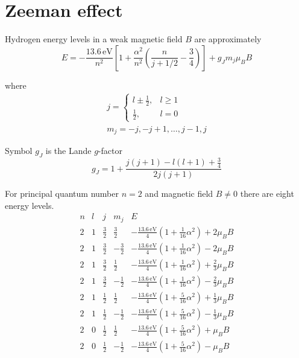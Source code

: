 

\section*{Zeeman effect}

Hydrogen energy levels in a weak magnetic field $B$ are approximately
\begin{equation*}
E=-\frac{13.6\,\text{eV}}{n^2}
\left[
1+\frac{\alpha^2}{n^2}\left(\frac{n}{j+1/2}-\frac{3}{4}\right)
\right]+g_Jm_j\mu_BB
\end{equation*}

where
\begin{gather*}
j=\begin{cases}
l\pm\frac{1}{2}, & l\ge1
\\
\frac{1}{2}, & l=0
\end{cases}
\\[1ex]
m_j=-j,-j+1,\ldots,j-1,j
\end{gather*}

Symbol $g_J$ is the Lande $g$-factor
\begin{equation*}
g_J=1+\frac{j(j+1)-l(l+1)+\frac{3}{4}}{2j(j+1)}
\end{equation*}

For principal quantum number $n=2$ and magnetic field $B\ne0$ there are eight energy levels.
\begin{equation*}
\begin{matrix}
n & l & j & m_j & E
\\[2ex]
2 & 1 & \frac{3}{2} & \frac{3}{2} &
-\frac{13.6\,\text{eV}}{4}\left(1+\tfrac{1}{16}\alpha^2\right)+2\mu_BB
\\[2ex]
2 & 1 & \frac{3}{2} & -\frac{3}{2} &
-\frac{13.6\,\text{eV}}{4}\left(1+\tfrac{1}{16}\alpha^2\right)-2\mu_BB
\\[2ex]
2 & 1 & \frac{3}{2} & \frac{1}{2} &
-\frac{13.6\,\text{eV}}{4}\left(1+\tfrac{1}{16}\alpha^2\right)+\frac{2}{3}\mu_BB
\\[2ex]
2 & 1 & \frac{3}{2} & -\frac{1}{2} &
-\frac{13.6\,\text{eV}}{4}\left(1+\tfrac{1}{16}\alpha^2\right)-\frac{2}{3}\mu_BB
\\[2ex]
2 & 1 & \frac{1}{2} & \frac{1}{2} &
-\frac{13.6\,\text{eV}}{4}\left(1+\tfrac{5}{16}\alpha^2\right)+\frac{1}{3}\mu_BB
\\[2ex]
2 & 1 & \frac{1}{2} & -\frac{1}{2} &
-\frac{13.6\,\text{eV}}{4}\left(1+\tfrac{5}{16}\alpha^2\right)-\frac{1}{3}\mu_BB
\\[2ex]
2 & 0 & \frac{1}{2} & \frac{1}{2} &
-\frac{13.6\,\text{eV}}{4}\left(1+\tfrac{5}{16}\alpha^2\right)+\mu_BB
\\[2ex]
2 & 0 & \frac{1}{2} & -\frac{1}{2} &
-\frac{13.6\,\text{eV}}{4}\left(1+\tfrac{5}{16}\alpha^2\right)-\mu_BB
\end{matrix}
\end{equation*}


